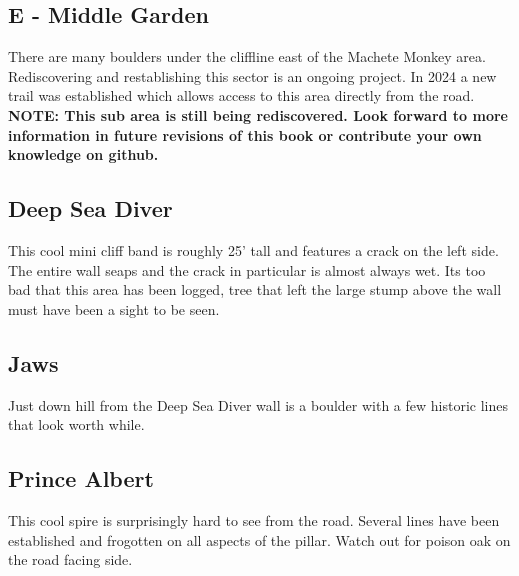 \begin{multicols}{2}
\newpage

\section{E - Middle Garden}\label{sa:Middle Garden}

There are many boulders under the cliffline east of the Machete Monkey area. Rediscovering and restablishing this sector is an ongoing project. In 2024 a new trail was established which allows access to this area directly from the road.\\
\textbf{NOTE: This sub area is still being rediscovered. Look forward to more information in future revisions of this book or contribute your own knowledge on github.}\\




\needspace{10em}
\subsection*{Deep Sea Diver}\label{bf:Deep Sea Diver}

This cool mini cliff band is roughly 25' tall and features a crack on the left side. The entire wall seaps and the crack in particular is almost always wet. Its too bad that this area has been logged, tree that left the large stump above the wall must have been a sight to be seen.\\




\needspace{10em}
\subsection*{Jaws}\label{bf:Jaws}

Just down hill from the Deep Sea Diver wall is a boulder with a few historic lines that look worth while.\\




\needspace{10em}
\subsection*{Prince Albert}\label{bf:Prince Albert}

This cool spire is surprisingly hard to see from the road. Several lines have been established and frogotten on all aspects of the pillar. Watch out for poison oak on the road facing side.\\





\end{multicols}
\clearpage
